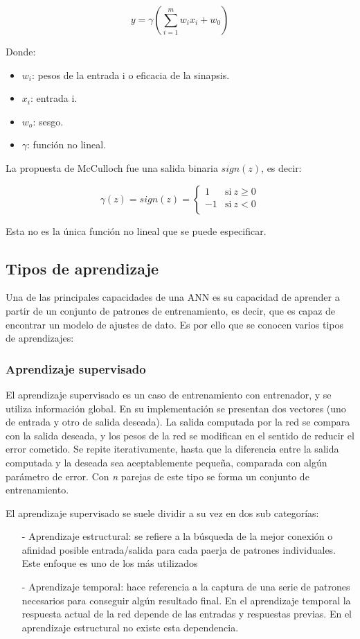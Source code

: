 $$ y = \gamma \left( \sum_{i = 1}^{m}w_ix_i + w_0 \right) $$

Donde:
\begin{itemize}
	\item $w_i$: pesos de la entrada i o eficacia de la sinapsis.
	\item $x_i$: entrada i.
	\item $w_o$: sesgo.
	\item $\gamma$: función no lineal.
\end{itemize}

La propuesta de McCulloch fue una salida binaria $sign(z)$, es decir:

$$ \gamma(z) = sign(z) = \left\{
	       \begin{array}{ll}
		 1      & \mathrm{si\ } z \ge 0 \\
		 -1	& \mathrm{si\ } z < 0  \\
	       \end{array}
	     \right. $$

Esta no es la única función no lineal que se puede especificar.

\subsection{Tipos de aprendizaje}

Una de las principales capacidades de una ANN es su capacidad de aprender a
partir de un conjunto de patrones de entrenamiento, es decir, que es capaz de
encontrar un modelo de ajustes de dato. Es por ello que se conocen varios tipos
de aprendizajes:

\subsubsection{Aprendizaje supervisado}

El aprendizaje supervisado es un caso de entrenamiento con entrenador, y se
utiliza información global. En su implementación se presentan dos vectores (uno
de entrada y otro de salida deseada).  La salida computada por la red se
compara con la salida deseada, y los pesos de la red se modifican en el
sentido de reducir el error cometido. Se repite iterativamente, hasta que la
diferencia entre la salida computada y la deseada sea aceptablemente pequeña,
comparada con algún parámetro de error. Con \emph{n} parejas de este tipo se
forma un conjunto de entrenamiento.

El aprendizaje supervisado se suele dividir a su vez en dos sub categorías:
\begin{itemize}
	\item[-] Aprendizaje estructural: se refiere a la búsqueda de la mejor 
conexión o afinidad posible entrada/salida para cada paerja de patrones 
individuales. Este enfoque es uno de los más utilizados
	\item[-] Aprendizaje temporal: hace referencia a la captura de una serie 
	de patrones necesarios para conseguir algún resultado final. En el aprendizaje 
	temporal la respuesta actual de la red depende de las entradas y respuestas 
	previas. En el aprendizaje estructural no existe esta dependencia.
\end{itemize}


